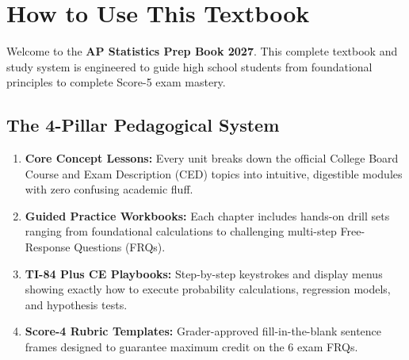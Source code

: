 ﻿\documentclass[11pt,oneside,openany]{book}
\begin{document}
\tableofcontents
\clearpage

\chapter*{How to Use This Textbook}

Welcome to the \textbf{AP Statistics Prep Book 2027}. This complete textbook and study system is engineered to guide high school students from foundational principles to complete Score-5 exam mastery.

\section*{The 4-Pillar Pedagogical System}
\begin{enumerate}[leftmargin=1.5em]
  \item \textbf{Core Concept Lessons:} Every unit breaks down the official College Board Course and Exam Description (CED) topics into intuitive, digestible modules with zero confusing academic fluff.
  \item \textbf{Guided Practice Workbooks:} Each chapter includes hands-on drill sets ranging from foundational calculations to challenging multi-step Free-Response Questions (FRQs).
  \item \textbf{TI-84 Plus CE Playbooks:} Step-by-step keystrokes and display menus showing exactly how to execute probability calculations, regression models, and hypothesis tests.
  \item \textbf{Score-4 Rubric Templates:} Grader-approved fill-in-the-blank sentence frames designed to guarantee maximum credit on the 6 exam FRQs.
\end{enumerate}
\end{document}
